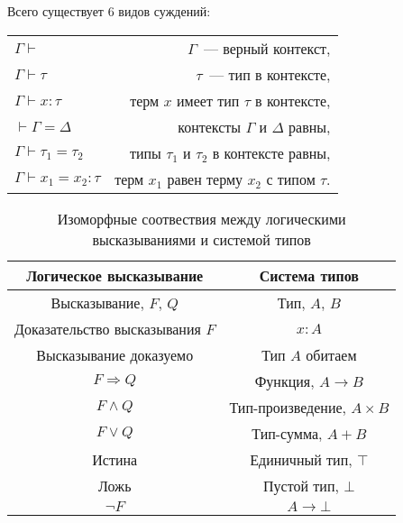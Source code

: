Всего существует 6 видов суждений:

\begin{table}[H]
    \centering
    \label{tab:types_of_judgments}
    \begin{tabular}{l r}
        $\Gamma \vdash$                  & $\Gamma$~--- верный контекст,                \\
        $\Gamma \vdash \tau$             & $\tau$~--- тип в контексте,                  \\
        $\Gamma \vdash x: \tau$          & терм $x$ имеет тип $\tau$ в контексте,       \\
        $\vdash \Gamma = \Delta$         & контексты $\Gamma$ и $\Delta$ равны,         \\
        $\Gamma \vdash \tau_1 = \tau_2$  & типы $\tau_1$ и $\tau_2$ в контексте равны,  \\
        $\Gamma \vdash x_1 = x_2 : \tau$ & терм $x_1$ равен терму $x_2$ с типом $\tau$.
    \end{tabular}
\end{table}

\begin{table}[h]
    \centering
    \caption{Изоморфные соотвествия между логическими высказываниями и системой типов}
    \label{tab:curry-hovard-iso}
    \begin{tabular}{|c|c|}
        \hline
        \textbf{Логическое высказывание} & \textbf{Система типов}         \\\hline
        Высказывание, $F$, $Q$           & Тип, $A$, $B$                  \\\hline
        Доказательство высказывания $F$  & $x: A$                         \\\hline
        Высказывание доказуемо           & Тип $A$ обитаем                \\\hline
        $F \Rightarrow Q$                & Функция, $A \to B$             \\\hline
        $F \wedge Q$                     & Тип-произведение, $A \times B$ \\\hline
        $F \vee Q$                       & Тип-сумма, $A + B$             \\\hline
        Истина                           & Единичный тип, $\top$          \\\hline
        Ложь                             & Пустой тип, $\bot$             \\\hline
        $\neg F$                         & $A \to \bot$                   \\\hline
    \end{tabular}
\end{table}

